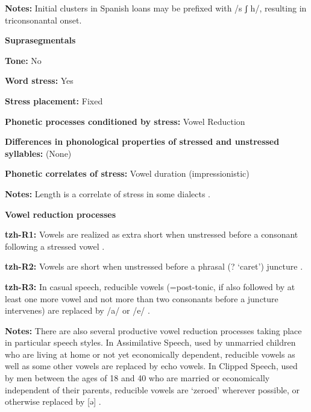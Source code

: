 \textbf{Notes:} Initial clusters in Spanish loans may be prefixed with /s ʃ h/, resulting in triconsonantal onset.



\textbf{Suprasegmentals}



\textbf{Tone:} No



\textbf{Word stress:} Yes



\textbf{Stress placement:} Fixed



\textbf{Phonetic processes conditioned by stress:} Vowel Reduction



\textbf{Differences in phonological properties of stressed and unstressed syllables:} (None)



\textbf{Phonetic correlates of stress:} Vowel duration (impressionistic)



\textbf{Notes:} Length is a correlate of stress in some dialects \citep[23]{Polian2006}.



\textbf{Vowel reduction processes}



\textbf{tzh-R1:} Vowels are realized as extra short when unstressed before a consonant following a stressed vowel \citep[12]{Kaufman1971}.



\textbf{tzh-R2:} Vowels are short when unstressed before a phrasal (? ‘caret’) juncture \citep[12]{Kaufman1971}.



\textbf{tzh-R3:} In casual speech, reducible vowels (=post-tonic, if also followed by at least one more vowel and not more than two consonants before a juncture intervenes) are replaced by /a/ or /e/ \citep[26-7]{Kaufman1971}.



\textbf{Notes:} There are also several productive vowel reduction processes taking place in particular speech styles. In Assimilative Speech, used by unmarried children who are living at home or not yet economically dependent, reducible vowels as well as some other vowels are replaced by echo vowels. In Clipped Speech, used by men between the ages of 18 and 40 who are married or economically independent of their parents, reducible vowels are ‘zeroed’ wherever possible, or otherwise replaced by [ə] \citep[26-7]{Kaufman1971}.



